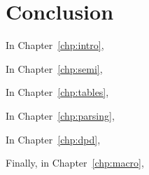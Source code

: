 \chapter{Conclusion}\label{chp:conclusion}

In Chapter~\ref{chp:intro},

In Chapter~\ref{chp:semi},

In Chapter~\ref{chp:tables},

In Chapter~\ref{chp:parsing},

In Chapter~\ref{chp:dpd},

Finally, in Chapter~\ref{chp:macro},